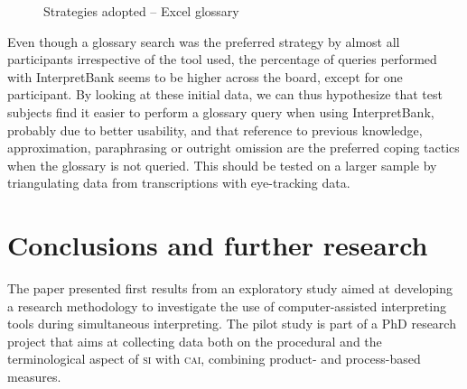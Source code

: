 \documentclass[output=paper]{langsci/langscibook}
\begin{document}
\begin{figure}
\caption{Strategies adopted -- Excel glossary} 
\label{fig:prandi:17}
\end{figure}

Even though a glossary search was the preferred strategy by almost all participants irrespective of the tool used, the percentage of queries performed with InterpretBank seems to be higher across the board, except for one participant. By looking at these initial data, we can thus hypothesize that test subjects find it easier to perform a glossary query when using InterpretBank, probably due to better usability, and that reference to previous knowledge, approximation, paraphrasing or outright omission are the preferred coping tactics when the glossary is not queried. This should be tested on a larger sample by triangulating data from transcriptions with eye-tracking data. 

\section{Conclusions and further research}\label{sec:prandi:6}
The paper presented first results from an exploratory study aimed at developing a research methodology to investigate the use of computer-assisted interpreting tools during simultaneous interpreting. The pilot study is part of a PhD research project that aims at collecting data both on the procedural and the terminological aspect of \textsc{si} with \textsc{cai}, combining product- and process-based measures. 
\end{document}
